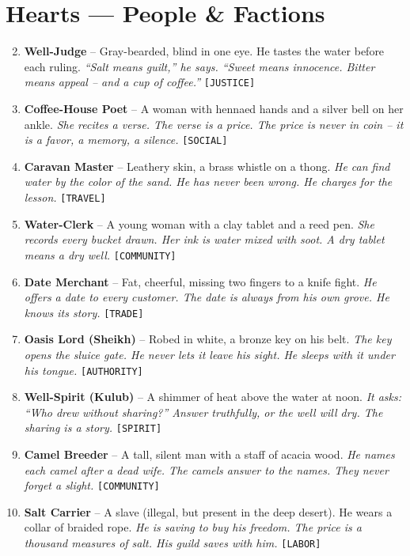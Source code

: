 \section*{Hearts --- People \& Factions}
\label{sec:fhara-people}
\begin{enumerate}
\setcounter{enumi}{1}
\item \textbf{Well-Judge} -- Gray-bearded, blind in one eye. He tastes the water before each ruling.
  \hfill \textit{``Salt means guilt,'' he says. ``Sweet means innocence. Bitter means appeal -- and a cup of coffee.''} \texttt{[JUSTICE]}
\item \textbf{Coffee-House Poet} -- A woman with hennaed hands and a silver bell on her ankle.
  \hfill \textit{She recites a verse. The verse is a price. The price is never in coin -- it is a favor, a memory, a silence.} \texttt{[SOCIAL]}
\item \textbf{Caravan Master} -- Leathery skin, a brass whistle on a thong.
  \hfill \textit{He can find water by the color of the sand. He has never been wrong. He charges for the lesson.} \texttt{[TRAVEL]}
\item \textbf{Water-Clerk} -- A young woman with a clay tablet and a reed pen.
  \hfill \textit{She records every bucket drawn. Her ink is water mixed with soot. A dry tablet means a dry well.} \texttt{[COMMUNITY]}
\item \textbf{Date Merchant} -- Fat, cheerful, missing two fingers to a knife fight.
  \hfill \textit{He offers a date to every customer. The date is always from his own grove. He knows its story.} \texttt{[TRADE]}
\item \textbf{Oasis Lord (Sheikh)} -- Robed in white, a bronze key on his belt.
  \hfill \textit{The key opens the sluice gate. He never lets it leave his sight. He sleeps with it under his tongue.} \texttt{[AUTHORITY]}
\item \textbf{Well-Spirit (Kulub)} -- A shimmer of heat above the water at noon.
  \hfill \textit{It asks: ``Who drew without sharing?'' Answer truthfully, or the well will dry. The sharing is a story.} \texttt{[SPIRIT]}
\item \textbf{Camel Breeder} -- A tall, silent man with a staff of acacia wood.
  \hfill \textit{He names each camel after a dead wife. The camels answer to the names. They never forget a slight.} \texttt{[COMMUNITY]}
\item \textbf{Salt Carrier} -- A slave (illegal, but present in the deep desert). He wears a collar of braided rope.
  \hfill \textit{He is saving to buy his freedom. The price is a thousand measures of salt. His guild saves with him.} \texttt{[LABOR]}

\end{enumerate}
